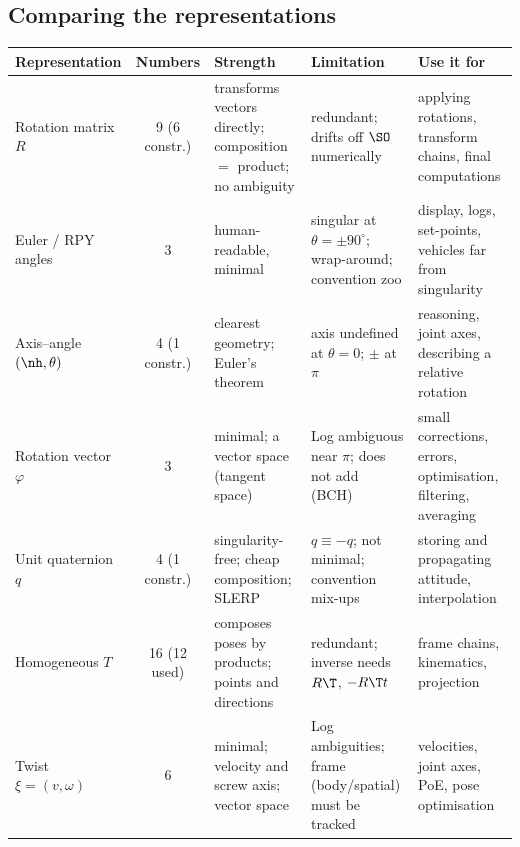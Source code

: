 \subsection{Comparing the representations}\label{sec:rot:comparing-representations}
\begin{center}\small
\renewcommand{\arraystretch}{1.15}
\begin{tabularx}{\linewidth}{@{}l c >{\raggedright\arraybackslash}X >{\raggedright\arraybackslash}X >{\raggedright\arraybackslash}X@{}}\toprule
Representation & Numbers & Strength & Limitation & Use it for\\\midrule
Rotation matrix $R$ & 9 (6 constr.) & transforms vectors directly; composition $=$ product; no ambiguity & redundant; drifts off $\SO$ numerically & applying rotations, transform chains, final computations\\
Euler / RPY angles & 3 & human-readable, minimal & singular at $\theta=\pm90^\circ$; wrap-around; convention zoo & display, logs, set-points, vehicles far from singularity\\
Axis--angle $(\nh,\theta)$ & 4 (1 constr.) & clearest geometry; Euler's theorem & axis undefined at $\theta=0$; $\pm$ at $\pi$ & reasoning, joint axes, describing a relative rotation\\
Rotation vector $\varphi$ & 3 & minimal; a vector space (tangent space) & Log ambiguous near $\pi$; does not add (BCH) & small corrections, errors, optimisation, filtering, averaging\\
Unit quaternion $q$ & 4 (1 constr.) & singularity-free; cheap composition; SLERP & $q\equiv-q$; not minimal; convention mix-ups & storing and propagating attitude, interpolation\\
Homogeneous $T$ & 16 (12 used) & composes poses by products; points and directions & redundant; inverse needs $R\T$, $-R\T t$ & frame chains, kinematics, projection\\
Twist $\xi=(v,\omega)$ & 6 & minimal; velocity and screw axis; vector space & Log ambiguities; frame (body/spatial) must be tracked & velocities, joint axes, PoE, pose optimisation\\\bottomrule
\end{tabularx}
\end{center}
